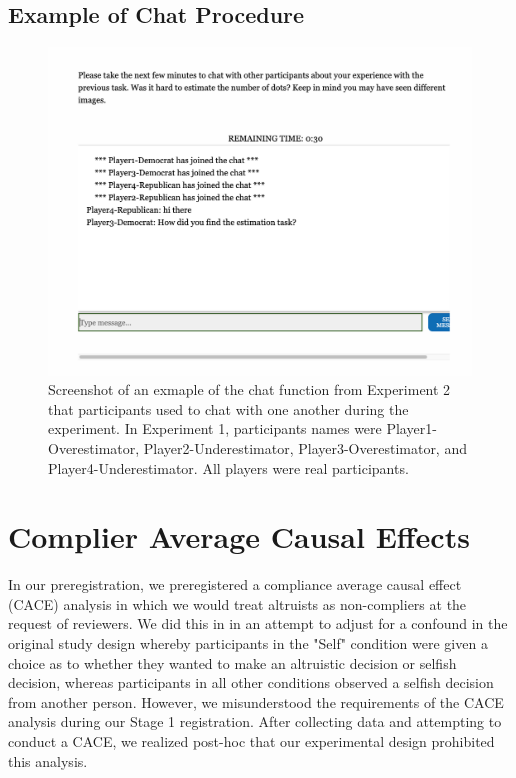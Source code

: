 \documentclass[12pt,]{article}
\begin{document}
 \subsection{Example of Chat Procedure}
\label{appendix:chat_proc}

\begin{figure}
	\centering
	\includegraphics{Plots/chatlog.png}
	\caption{Screenshot of an exmaple of the chat function from Experiment 2 that participants used to chat with one another during the experiment. In Experiment 1, participants names were Player1-Overestimator, Player2-Underestimator, Player3-Overestimator, and Player4-Underestimator. All players were real participants.}
	\label{fig:chatlog}
\end{figure}




\clearpage
\section{Complier Average Causal Effects}
\label{appendix:CACE}

In our preregistration, we preregistered a compliance average causal effect (CACE) analysis in which we would treat altruists as non-compliers at the request of reviewers. We did this in in an attempt to adjust for a confound in the original study design whereby participants in the "Self" condition were given a choice as to whether they wanted to make an altruistic decision or selfish decision, whereas participants in all other conditions observed a selfish decision from another person. However, we misunderstood the requirements of the CACE analysis during our Stage 1 registration. After collecting data and attempting to conduct a CACE, we realized post-hoc that our experimental design prohibited this analysis. 
\end{document}
